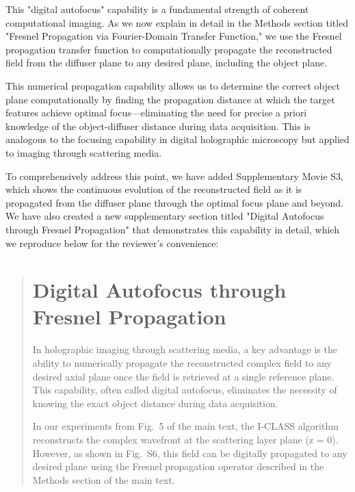 \documentclass[12pt]{article}
\newenvironment{ourresponse}
    {\begin{tcolorbox}[width=\linewidth,breakable,enhanced,colback=gray!5,colframe=responsecolor!50,title=Response,left=5pt,right=5pt]}
    {\end{tcolorbox}}
\begin{document}
\begin{enumerate}[label=\arabic*.]
\begin{enumerate}[label=3.\alph*.]
\begin{ourresponse}
            This "digital autofocus" capability is a fundamental strength of coherent computational imaging. As we now explain in detail in the Methods section titled "Fresnel Propagation via Fourier-Domain Transfer Function," we use the Fresnel propagation transfer function to computationally propagate the reconstructed field from the diffuser plane to any desired plane, including the object plane.
            
            This numerical propagation capability allows us to determine the correct object plane computationally by finding the propagation distance at which the target features achieve optimal focus—eliminating the need for precise a priori knowledge of the object-diffuser distance during data acquisition. This is analogous to the focusing capability in digital holographic microscopy but applied to imaging through scattering media.
            
            To comprehensively address this point, we have added Supplementary Movie S3, which shows the continuous evolution of the reconstructed field as it is propagated from the diffuser plane through the optimal focus plane and beyond. We have also created a new supplementary section titled "Digital Autofocus through Fresnel Propagation" that demonstrates this capability in detail, which we reproduce below for the reviewer's convenience:
        
            \begin{quote}
                \section*{Digital Autofocus through Fresnel Propagation}
                
                In holographic imaging through scattering media, a key advantage is the ability to numerically propagate the reconstructed complex field to any desired axial plane once the field is retrieved at a single reference plane. This capability, often called digital autofocus, eliminates the necessity of knowing the exact object distance during data acquisition.
                
                In our experiments from Fig.~5 of the main text, the I-CLASS algorithm reconstructs the complex wavefront at the scattering layer plane (z = 0). However, as shown in Fig.~S6, this field can be digitally propagated to any desired plane using the Fresnel propagation operator described in the Methods section of the main text. 
                

\end{quote}
\end{ourresponse}
\end{enumerate}
\end{enumerate}
\end{document}
